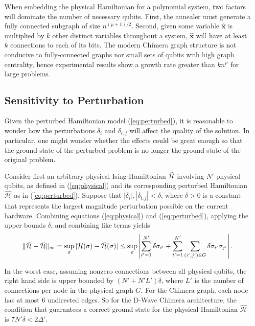 When embedding the physical Hamiltonian for a polynomial system, two factors will dominate the number of necessary qubits.
First, the annealer must generate a fully connected subgraph of size $n^{(\mu + 1)/2}$.
Second, given some variable $\hat{\mathbf{x}}$ is multiplied by $k$ other distinct variables throughout a system, $\hat {\mathbf{x}}$ will have at least $k$ connections to each of its bits.
The modern Chimera graph structure is not conducive to fully-connected graphs nor small sets of qubits with high graph centrality, hence experimental results show a growth rate greater than $k n^\mu$ for large problems.

\subsection{Sensitivity to Perturbation}

Given the perturbed Hamiltonian model (\ref{eq:perturbed}), it is reasonable
to wonder how the perturbations $\delta_i$ and $\delta_{i,j}$ will affect
the quality of the solution.
In particular, one might wonder whether the effects could be great enough
so that the ground state of the perturbed problem is no longer the ground
state of the original problem.

Consider first an arbitrary physical Ising-Hamiltonian $\Tilde{\mathcal{H}}$ involving $N'$ physical qubits, as defined in (\ref{eq:physical}) and its corresponding perturbed Hamiltonian $\hat{\mathcal{H}}$ as in (\ref{eq:perturbed}).
Suppose that $|\delta_i|, |\delta_{i,j}| < \delta$, where $\delta>0$ is a constant that represents the largest magnitude perturbation possible on the current hardware.
Combining equations (\ref{eq:physical}) and (\ref{eq:perturbed}), applying the upper bounds $\delta$, and combining like terms yields
$$
\|\Tilde{\mathcal{H}} - \hat{\mathcal{H}}\|_\infty
= \sup_{\sigma} |\mathcal{H}(\sigma) - \hat{\mathcal{H}}(\sigma)|
\leq \sup_\sigma \left|\sum_{i'=1}^{N'} \delta \sigma_{i'} +
\sum_{i'=1}^{N'}\sum_{(i',j')\in G}\delta\sigma_{i'}\sigma_{j'} \right|.
$$

In the worst case, assuming nonzero connections between all physical qubits, the right hand side is upper bounded by $(N' + N' L')\delta$, where $L'$ is the number of connections per node in the physical graph $G$.
For the Chimera graph, each node has at most $6$ undirected edges.
So for the D-Wave Chimera architecture, the condition that guarantees a correct ground state for the physical Hamiltonian $\hat{\mathcal{H}}$ is $7N' \delta < 2\Delta'$.
